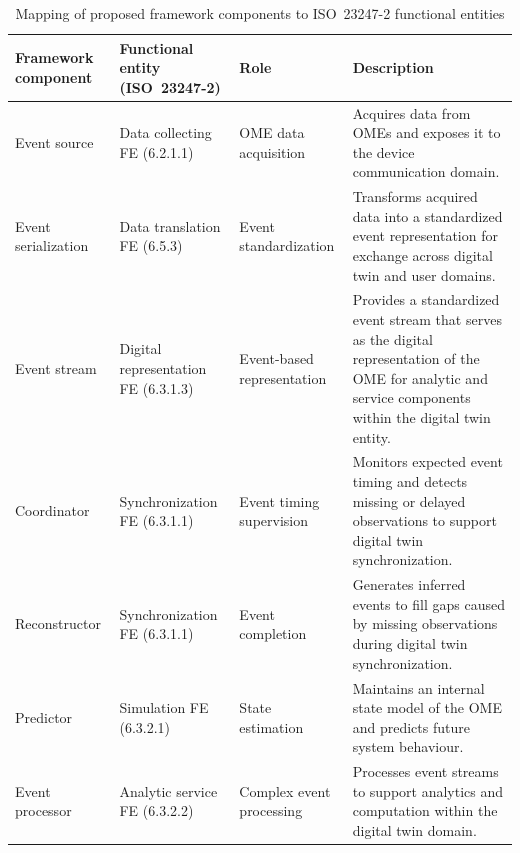 \begin{table}[t]
\centering
\footnotesize
\caption{Mapping of proposed framework components to ISO~23247-2 functional entities}
\label{tab:iso23247-fe-mapping}
\renewcommand{\arraystretch}{1.2}
\begin{tabularx}{\textwidth}{p{2.4cm} p{3.1cm} p{2.5cm} X}
\toprule
\textbf{Framework component} &
\textbf{Functional entity (ISO~23247-2)} &
\textbf{Role} &
\textbf{Description} \\
\midrule

Event source &
Data collecting FE (6.2.1.1) &
OME data acquisition &
Acquires data from OMEs and exposes it to the device communication domain. \\

\makecell[l]{Event \\ serialization} &
Data translation FE (6.5.3) &
Event standardization &
Transforms acquired data into a standardized event representation for exchange across digital twin and user domains. \\

Event stream &
Digital representation FE (6.3.1.3) &
Event-based representation &
Provides a standardized event stream that serves as the digital representation of the OME for analytic and service components within the digital twin entity. \\

Coordinator &
Synchronization FE (6.3.1.1) &
Event timing supervision &
Monitors expected event timing and detects missing or delayed observations to support digital twin synchronization. \\

Reconstructor &
Synchronization FE (6.3.1.1) &
Event completion &
Generates inferred events to fill gaps caused by missing observations during digital twin synchronization. \\

Predictor &
Simulation FE (6.3.2.1) &
State estimation &
Maintains an internal state model of the OME and predicts future system behaviour. \\

Event processor &
Analytic service FE (6.3.2.2) &
Complex event processing &
Processes event streams to support analytics and computation within the digital twin domain. \\


\bottomrule
\end{tabularx}
\end{table}
